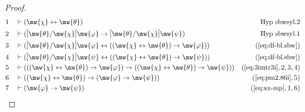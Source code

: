 \begin{proof}
\begin{align}
  1 &&  & \vdash ( \mw{\chi} \leftrightarrow \mw{\theta}
     )&\text{Hyp~sbwsyl.2}\notag%
  \\ 2 &&  & \vdash ( \overline{[} \mw{\theta} / \mw{\chi} \overline{]}
     \mw{\varphi} \rightarrow \overline{[} \mw{\theta} /
     \mw{\chi} \overline{]} \mw{\psi}
     )&\text{Hyp~sbwsyl.1}\notag%
  \\ 3 &&  & \vdash ( \overline{[} \mw{\theta} / \mw{\chi} \overline{]}
     \mw{\varphi} \leftrightarrow ( ( \mw{\chi}
     \leftrightarrow \mw{\theta} ) \rightarrow
     \mw{\varphi} ) )&(\mbox{\ref{eq:df-bl.sbw}})\notag
  \\ 4 &&  & \vdash ( \overline{[} \mw{\theta} / \mw{\chi} \overline{]}
     \mw{\psi} \leftrightarrow ( ( \mw{\chi}
     \leftrightarrow \mw{\theta} ) \rightarrow \mw{\psi} )
     )&(\mbox{\ref{eq:df-bl.sbw}})\notag
  \\ 5 &&  & \vdash ( ( ( \mw{\chi} \leftrightarrow \mw{\theta} ) \rightarrow
     \mw{\varphi} ) \rightarrow ( ( \mw{\chi}
     \leftrightarrow \mw{\theta} ) \rightarrow \mw{\psi} )
     )&(\mbox{\ref{eq:3imtr3i}},2,3,4)\notag
  \\ 6 &&  & \vdash ( ( \mw{\chi} \leftrightarrow \mw{\theta} ) \rightarrow (
     \mw{\varphi} \rightarrow \mw{\psi} )
     )&(\mbox{\ref{eq:pm2.86i}},5)\notag
  \\ 7 &&  & \vdash ( \mw{\varphi} \rightarrow \mw{\psi}
     )&(\mbox{\ref{eq:ax-mp}},1,6)\notag
\end{align}
\end{proof}

